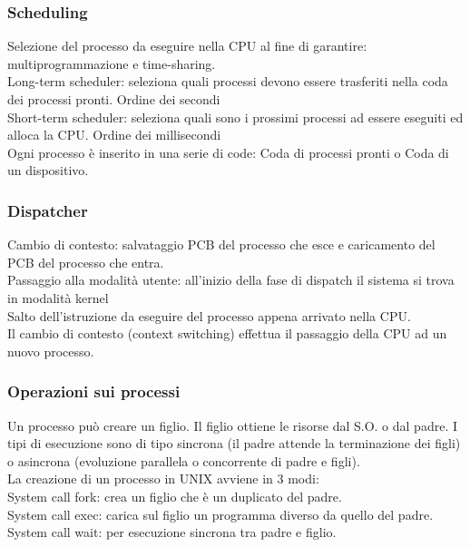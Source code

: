 \documentclass{article}
\begin{document}
\subsubsection*{Scheduling}
Selezione del processo da eseguire nella CPU al fine di garantire: multiprogrammazione e time-sharing.\\
Long-term scheduler: seleziona quali processi devono essere trasferiti nella coda dei processi pronti. Ordine dei secondi\\
Short-term scheduler: seleziona quali sono i prossimi processi ad essere eseguiti ed alloca la CPU. Ordine dei millisecondi\\
Ogni processo \`{e} inserito in una serie di code: Coda di processi pronti o Coda di un dispositivo.\\
\subsubsection*{Dispatcher}
Cambio di contesto: salvataggio PCB del processo che esce e caricamento del PCB del processo che entra.\\
Passaggio alla modalit\`{a} utente: all'inizio della fase di dispatch il sistema si trova in modalit\`{a} kernel\\
Salto dell'istruzione da eseguire del processo appena arrivato nella CPU.\\
Il cambio di contesto (context switching) effettua il passaggio della CPU ad un nuovo processo.
\subsubsection*{Operazioni sui processi}
Un processo pu\`{o} creare un figlio. Il figlio ottiene le risorse dal S.O. o dal padre. I tipi di esecuzione sono di tipo sincrona (il padre attende la terminazione dei figli) o asincrona (evoluzione parallela o concorrente di padre e figli).\\
La creazione di un processo in UNIX avviene in 3 modi:\\
System call fork: crea un figlio che \`{e} un duplicato del padre.\\
System call exec: carica sul figlio un programma diverso da quello del padre.\\
System call wait: per esecuzione sincrona tra padre e figlio.\\
\end{document}
